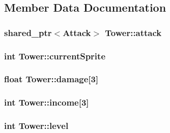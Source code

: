 \subsection{Member Data Documentation}
\hypertarget{class_tower_a4269c70ee90c69a064bc6d6690bb354a}{
\subsubsection[{attack}]{\setlength{\rightskip}{0pt plus 5cm}shared\+\_\+ptr$<${\bf Attack}$>$ Tower\+::attack\hspace{0.3cm}{\ttfamily [protected]}}}\label{class_tower_a4269c70ee90c69a064bc6d6690bb354a}
\hypertarget{class_tower_ae9ab0c86f3c1bdd5e73a5cdee4bdfd96}{
\subsubsection[{current\+Sprite}]{\setlength{\rightskip}{0pt plus 5cm}int Tower\+::current\+Sprite\hspace{0.3cm}{\ttfamily [protected]}}}\label{class_tower_ae9ab0c86f3c1bdd5e73a5cdee4bdfd96}
\hypertarget{class_tower_a6486b52fd99b92955a2f3424884286b9}{
\subsubsection[{damage}]{\setlength{\rightskip}{0pt plus 5cm}float Tower\+::damage\mbox{[}3\mbox{]}\hspace{0.3cm}{\ttfamily [protected]}}}\label{class_tower_a6486b52fd99b92955a2f3424884286b9}
\hypertarget{class_tower_a9e86386041605d8b9f53356c6fc18d34}{
\subsubsection[{income}]{\setlength{\rightskip}{0pt plus 5cm}int Tower\+::income\mbox{[}3\mbox{]}\hspace{0.3cm}{\ttfamily [protected]}}}\label{class_tower_a9e86386041605d8b9f53356c6fc18d34}
\hypertarget{class_tower_a586375a39e6817983339b36225379da0}{
\subsubsection[{level}]{\setlength{\rightskip}{0pt plus 5cm}int Tower\+::level\hspace{0.3cm}{\ttfamily [protected]}}}\label{class_tower_a586375a39e6817983339b36225379da0}
